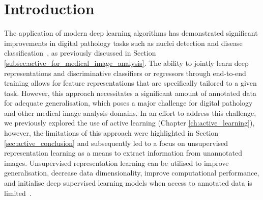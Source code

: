 \section{Introduction}
\label{sec:unsupervised_intro}
The application of modern deep learning algorithms has demonstrated significant improvements in digital pathology tasks such as nuclei detection and disease classification~\citep{litjens2017survey}, as previously discussed in Section \ref{subsec:active_for_medical_image_analysis}. The ability to jointly learn deep representations and discriminative classifiers or regressors through end-to-end training allows for feature representations that are specifically tailored to a given task. However, this approach necessitates a significant amount of annotated data for adequate generalisation, which poses a major challenge for digital pathology~\citep{madabhushi2016image} and other medical image analysis domains. In an effort to address this challenge, we previously explored the use of active learning (Chapter \ref{ch:active_learning}), however, the limitations of this approach were highlighted in Section \ref{sec:active_conclusion} and subsequently led to a focus on unsupervised representation learning as a means to extract information from unannotated images. Unsupervised representation learning can be utilised to improve generalisation, decrease data dimensionality, improve computational performance, and initialise deep supervised learning models when access to annotated data is limited~\citep{bengio2013representation}.

